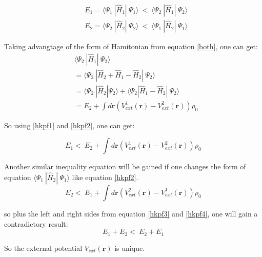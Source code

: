 \documentclass[a4paper]{report}
\begin{document}
\begin{equation}\label{hkpf1}\begin{split}
&  E_1 = \langle \Psi_1\ |\hat{H}_{1}|\ \Psi_1 \rangle  \ < \  \langle \Psi_2\ |\hat{H}_{1}|\ \Psi_2 \rangle\\
&  E_2 = \langle \Psi_2\ |\hat{H}_{2}|\ \Psi_2 \rangle  \ < \  \langle \Psi_1\ |\hat{H}_{2}|\ \Psi_1 \rangle
\end{split}\end{equation}

\noindent Taking advangtage of the form of Hamitonian from equation \ref{both}, one can get:
\begin{equation}\label{hkpf2}\begin{split}
&    \langle \Psi_2\ |\hat{H}_{1}|\ \Psi_2 \rangle \\
&  = \langle \Psi_2\ |\hat{H}_{2} + \hat{H}_{1} - \hat{H}_{2}|\ \Psi_2 \rangle \\
&  = \langle \Psi_2\ |\hat{H}_{2} |\Psi_2 \rangle + \langle \Psi_2 | \hat{H}_{1} - \hat{H}_{2}|\ \Psi_2 \rangle \\
&  = E_2 + \int d \textbf{r} ( V^{1}_\textit{ext}(\textbf{r}) - V^{2}_\textit{ext}(\textbf{r}) )  \rho_0
\end{split}\end{equation}

\noindent So using \ref{hkpf1} and \ref{hkpf2}, one can get:

\begin{equation}\label{hkpf3}
 E_1  < \  E_2 + \int d \textbf{r} ( V^{1}_\textit{ext}(\textbf{r}) - V^{2}_\textit{ext}(\textbf{r}) )  \rho_0
\end{equation}

\noindent Another similar inequality equation will be gained if one changes the form of equation $\langle \Psi_1\ |\hat{H}_{2}|\ \Psi_1 \rangle$ like equation \ref{hkpf2}.
\begin{equation}\label{hkpf4}
  E_2  < \  E_1 + \int d \textbf{r} ( V^{2}_\textit{ext}(\textbf{r}) - V^{1}_\textit{ext}(\textbf{r}) )  \rho_0
\end{equation}

\noindent so plus the left and right sides from equation \ref{hkpf3} and \ref{hkpf4}, one will gain a contradictory result:
\begin{equation}\label{hkpf4}
  E_1 + E_2  < \  E_2 + E_1
\end{equation}

\noindent So the external potential $V_\textit{ext}(\textbf{r})$ is unique.
\end{document}
